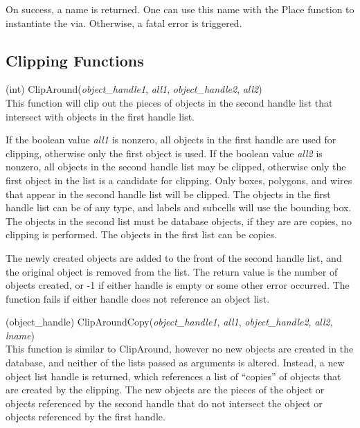 \begin{description}
On success, a name is returned.  One can use this name with the {\vt
Place} function to instantiate the via.  Otherwise, a fatal error is
triggered.
\end{description}


\subsection{Clipping Functions}

\begin{description}
\item{(int) \vt ClipAround({\it object\_handle1}, {\it all1\/},
 {\it object\_handle2}, {\it all2\/})}\\
This function will clip out the pieces of objects in the second handle
list that intersect with objects in the first handle list.

If the boolean value {\it all1} is nonzero, all objects in the first
handle are used for clipping, otherwise only the first object is used. 
If the boolean value {\it all2} is nonzero, all objects in the second
handle list may be clipped, otherwise only the first object in the
list is a candidate for clipping.  Only boxes, polygons, and wires
that appear in the second handle list will be clipped.  The objects in
the first handle list can be of any type, and labels and subcells will
use the bounding box.  The objects in the second list must be database
objects, if they are are copies, no clipping is performed.  The
objects in the first list can be copies.

The newly created objects are added to the front of the second handle
list, and the original object is removed from the list.  The return
value is the number of objects created, or -1 if either handle is
empty or some other error occurred.  The function fails if either
handle does not reference an object list.

\item{(object\_handle) \vt ClipAroundCopy({\it object\_handle1},
 {\it all1\/}, {\it object\_handle2}, {\it all2\/}, {\it lname})}\\
This function is similar to {\vt ClipAround}, however no new objects
are created in the database, and neither of the lists passed as
arguments is altered.  Instead, a new object list handle is returned,
which references a list of ``copies'' of objects that are created by
the clipping.  The new objects are the pieces of the object or objects
referenced by the second handle that do not intersect the object or
objects referenced by the first handle.


\end{description}
